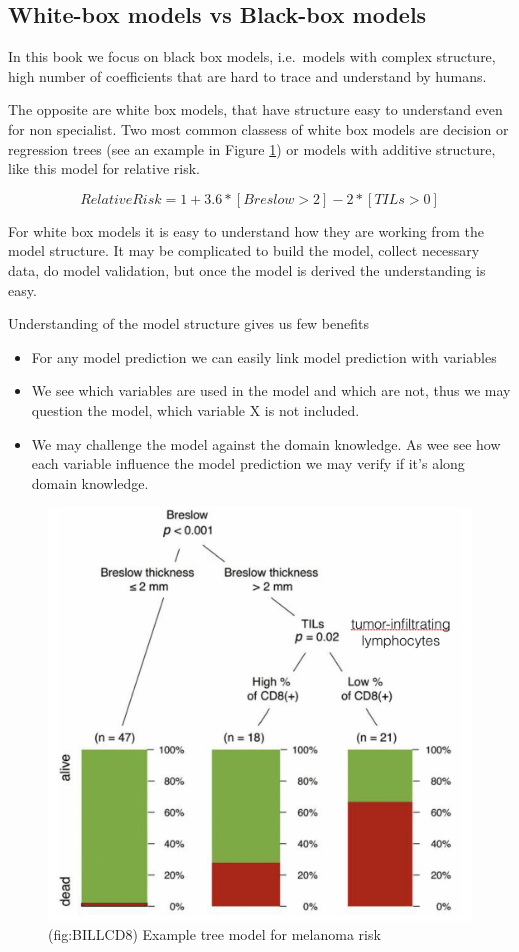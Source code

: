 \documentclass[]{krantz}
\providecommand{\tightlist}{%
  \setlength{\itemsep}{0pt}\setlength{\parskip}{0pt}}
\theoremstyle{definition}
\theoremstyle{definition}
\theoremstyle{definition}
\theoremstyle{remark}
\begin{document}
\hypertarget{white-box-models-vs-black-box-models}{%
\subsection{White-box models vs Black-box
models}\label{white-box-models-vs-black-box-models}}

In this book we focus on black box models, i.e.~models with complex
structure, high number of coefficients that are hard to trace and
understand by humans.

The opposite are white box models, that have structure easy to
understand even for non specialist. Two most common classess of white
box models are decision or regression trees (see an example in Figure
\ref{fig:BILLCD8}) or models with additive structure, like this model
for relative risk.

\[
RelativeRisk = 1 + 3.6 * [Breslow > 2] - 2 * [TILs > 0] 
\]

For white box models it is easy to understand how they are working from
the model structure. It may be complicated to build the model, collect
necessary data, do model validation, but once the model is derived the
understanding is easy.

Understanding of the model structure gives us few benefits

\begin{itemize}
\tightlist
\item
  For any model prediction we can easily link model prediction with
  variables
\item
  We see which variables are used in the model and which are not, thus
  we may question the model, which variable X is not included.
\item
  We may challenge the model against the domain knowledge. As wee see
  how each variable influence the model prediction we may verify if it's
  along domain knowledge.
\end{itemize}

\begin{figure}

{\centering \includegraphics[width=0.5\linewidth]{figure/wbBILL8model} 

}

\caption{(fig:BILLCD8) Example tree model for melanoma risk}\label{fig:BILLCD8}
\end{figure}
\end{document}
